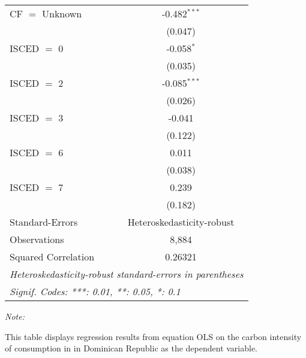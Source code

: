 \begin{table}[htbp!]
\begin{adjustbox}{width = 1\textwidth, max height = 0.95\textheight, center}
\begin{threeparttable}[b]
\begin{tabular}{lc}
            CF $=$ Unknown      & -0.482$^{***}$\\   
                                & (0.047)\\   
            ISCED $=$ 0         & -0.058$^{*}$\\   
                                & (0.035)\\   
            ISCED $=$ 2         & -0.085$^{***}$\\   
                                & (0.026)\\   
            ISCED $=$ 3         & -0.041\\   
                                & (0.122)\\   
            ISCED $=$ 6         & 0.011\\   
                                & (0.038)\\   
            ISCED $=$ 7         & 0.239\\   
                                & (0.182)\\   
            \midrule 
            Standard-Errors     & Heteroskedasticity-robust \\   
            Observations        & 8,884\\  
            Squared Correlation & 0.26321\\  
            \midrule \midrule
            \multicolumn{2}{l}{\emph{Heteroskedasticity-robust standard-errors in parentheses}}\\
            \multicolumn{2}{l}{\emph{Signif. Codes: ***: 0.01, **: 0.05, *: 0.1}}\\
         \end{tabular}
         
         \begin{tablenotes}\item \medskip \textit{Note:}
            \item This table displays regression results from equation OLS on the carbon intensity of consumption in  in Dominican Republic as the dependent variable. 
         \end{tablenotes}
      \end{threeparttable}
   \end{adjustbox}
\end{table}


